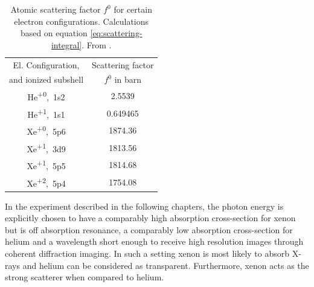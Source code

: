 \begin{table}
	\centering
		\begin{tabular}{ | c | c | }
		\hline
			El. Configuration, & Scattering factor \\
			and ionized subshell & $f^{0}$ in barn \\ \hline
			He\textsuperscript{+0},\ 1s2 & 2.5539  \\ \hline
			He\textsuperscript{+1},\ 1s1 & 0.649465  \\ \hline
			Xe\textsuperscript{+0},\ 5p6 & 1874.36  \\ \hline
			Xe\textsuperscript{+1},\ 3d9 & 1813.56  \\ \hline
			Xe\textsuperscript{+1},\ 5p5 & 1814.68  \\ \hline
			Xe\textsuperscript{+2},\ 5p4 & 1754.08  \\ \hline
		\end{tabular}
	\caption[Atomic scattering factors for helium and xenon.]{Atomic scattering factor $f^{0}$ for certain electron configurations. Calculations based on equation \eqref{eq:scattering-integral}. From \cite{Ho-2016-PC}.}
	\label{tab:helium-xenon-el-scattering-crossection}
\end{table}
In the experiment described in the following chapters, the photon energy is explicitly chosen to have a comparably high absorption cross-section for xenon but is off absorption resonance, a comparably low absorption cross-section for helium and a wavelength short enough to receive high resolution images through coherent diffraction imaging. In such a setting xenon is most likely to absorb X-rays and helium can be considered as transparent. Furthermore, xenon acts as the strong scatterer when compared to helium.
%
%
%
%
%
